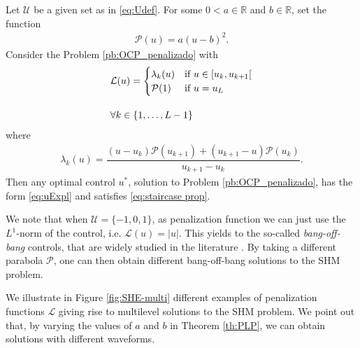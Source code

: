 \documentclass[twocolumn]{autart}    %
\begin{document}
\vspace{1em}
\begin{theorem}\label{th:PLP}
Let $\mathcal{U}$ be a given set as in \eqref{eq:Udef}.
For some $0<a\in\mathbb{R}$ and $b\in \mathbb{R}$, set the function
\begin{align*}
	\mathcal{P}(u) = a (u-b)^2.
\end{align*}
Consider the Problem \ref{pb:OCP_penalizado} with 
\begin{align}\label{eq:PLP}
	&\mathcal{L}(u) = \begin{cases}
            \lambda_k(u) & \text{if }  u \in [u_k,u_{k+1}[ \\ \mathcal{P}(1) & \text{if } u = u_{L} 
    \end{cases} 
	\\[10pt]
	&\notag \forall k \in \{1,\dots,L-1\} 
\end{align}
where 
\begin{align}\label{eq:lambda k}
	\lambda_k(u) = \dfrac{ (u-u_k)\mathcal{P}(u_{k+1}) + (u_{k+1}- u) \mathcal{P}(u_k)}{u_{k+1} - u_k}.
\end{align}
Then any optimal control $u^\ast$, solution to Problem \ref{pb:OCP_penalizado}, has the form \eqref{eq:uExpl} and satisfies \eqref{eq:staircase prop}.
\end{theorem}

\bigskip

\begin{remark}
We note that when  $\mathcal{U}= \{-1,0,1\}$, as penalization function we can just use the $L^1$-norm of the control, i.e. $\mathcal{L}(u) = |u|$. This yields to the so-called \emph{bang-off-bang} controls, that are widely studied in the literature \cite{nagahara2013maximum,ikeda2016maximum}. By taking a different parabola $\mathcal{P}$, one can then obtain different bang-off-bang solutions to the SHM problem.
\end{remark}

We illustrate in Figure \ref{fig:SHE-multi} different examples of penalization functions $\mathcal{L}$ giving rise to multilevel solutions to the SHM problem. We point out that, by varying the values of $a$ and $b$ in Theorem \ref{th:PLP}, we can obtain solutions with different waveforms.

\bigskip
\end{document}

